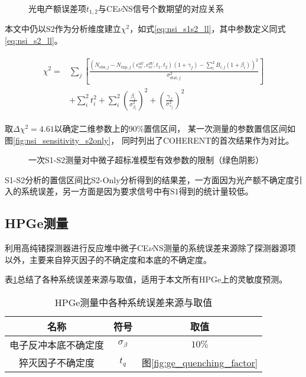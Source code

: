 \begin{figure}
  \centering
  
  \caption{\label{fig:exp_s1s2_t1t2} 光电产额误差项$t_{1,2}$与CE$\nu$NS信号个数期望的对应关系}
\end{figure}

本文中仍以$\mathrm{S2}$作为分析维度建立$\chi^2$，如式\ref{eq:nsi_s1s2_ll}，其中参数定义同式\ref{eq:nsi_s2_ll}。

\begin{align}
    \label{eq:nsi_s1s2_ll}
    \begin{split}
    \chi^2 =& \sum_j\left[\frac{\left(N_{\mathrm{obs},j} - N_{\mathrm{exp},j}(\epsilon^{uV}_{ee}, \epsilon^{dV}_{ee}, t_1, t_2)(1 + \gamma_f) 
    - \sum_{i}^2 B_{i,j}(1 + \beta_i)\right)^2}{\sigma^2_{\mathrm{stat},j}}\right] \\
    & + \sum_{i}^2 t_i^2 + \sum_{i}^2(\frac{\beta_i}{\sigma^2_{\beta_i}})^2 + (\frac{\gamma_f}{\sigma^2_{\gamma_f}})^2
    \end{split}
\end{align}

取$\Delta \chi^2=4.61$以确定二维参数上的90\%置信区间，
某一次测量的参数置信区间如图\ref{fig:nsi_sensitivity_s2only}，
同时列出了COHERENT的首次结果作为对比\cite{akimov_observation_2017}。

\begin{figure}
  \centering
  
  \caption{\label{fig:nsi_sensitivity_s1s2} 一次S1-S2测量对中微子超标准模型有效参数的限制（绿色阴影）}
\end{figure}

S1-S2分析的置信区间比S2-Only分析得到的结果差，一方面因为光产额不确定度引入的系统误差，另一方面是因为要求信号中有$\mathrm{S1}$得到的统计量较低。

\subsection{HPGe测量}

利用高纯锗探测器进行反应堆中微子CE$\nu$NS测量的系统误差来源除了探测器源项以外，主要来自猝灭因子的不确定度和本底的不确定度。

表\ref{tab:sys_error_ge}总结了各种系统误差来源与取值，适用于本文所有HPGe上的灵敏度预测。

\begin{table}
  \centering
  \caption{HPGe测量中各种系统误差来源与取值}
  \begin{tabular}{ccc}
    \toprule
    名称 & 符号 & 取值 \\
    \midrule
    电子反冲本底不确定度 & $\sigma_{\beta}$ & $10\%$ \\
    猝灭因子不确定度 & $t_q$ & 图\ref{fig:ge_quenching_factor} \\
    \bottomrule
  \end{tabular}
  \label{tab:sys_error_ge}
\end{table}

